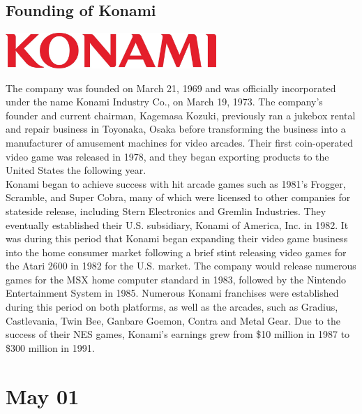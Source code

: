 \documentclass[11pt]{report}
\begin{document}
\subsection{Founding of Konami}
\vspace{2mm}\begin{center}\includegraphics[width=8cm]{./img/konamiLogo.jpg}\end{center}
The company was founded on March 21, 1969 and was officially incorporated under the name Konami Industry Co., on March 19, 1973. The company's founder and current chairman, Kagemasa Kozuki, previously ran a jukebox rental and repair business in Toyonaka, Osaka before transforming the business into a manufacturer of amusement machines for video arcades. Their first coin-operated video game was released in 1978, and they began exporting products to the United States the following year.\\ \indent Konami began to achieve success with hit arcade games such as 1981's Frogger, Scramble, and Super Cobra, many of which were licensed to other companies for stateside release, including Stern Electronics and Gremlin Industries. They eventually established their U.S. subsidiary, Konami of America, Inc. in 1982. It was during this period that Konami began expanding their video game business into the home consumer market following a brief stint releasing video games for the Atari 2600 in 1982 for the U.S. market. The company would release numerous games for the MSX home computer standard in 1983, followed by the Nintendo Entertainment System in 1985. Numerous Konami franchises were established during this period on both platforms, as well as the arcades, such as Gradius, Castlevania, Twin Bee, Ganbare Goemon, Contra and Metal Gear. Due to the success of their NES games, Konami's earnings grew from \$10 million in 1987 to \$300 million in 1991.
\section{May 01}
\end{document}
